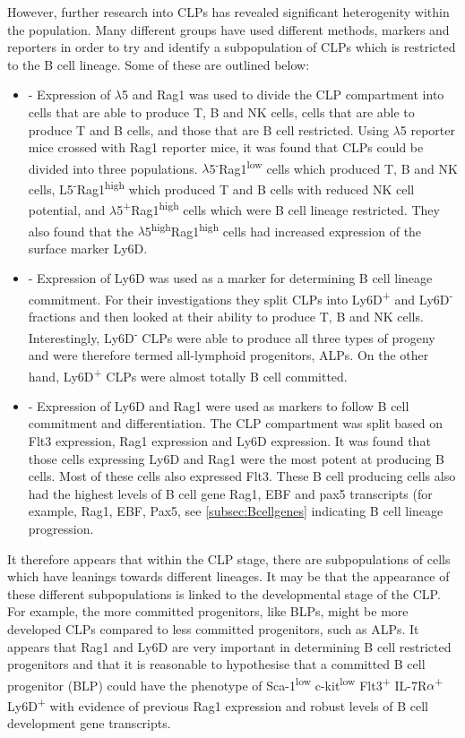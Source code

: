 However, further research into CLPs has revealed significant heterogenity within the population.
Many different groups have used different methods, markers and reporters in order to try and identify a subpopulation of CLPs which is restricted to the B cell lineage. 
Some of these are outlined below:
\begin{itemize}
\item \citet{Mansson2010} - Expression of $\lambda$5 and Rag1 was used to divide the CLP compartment into cells that are able to produce T, B and NK cells, cells that are able to produce T and B cells, and those that are B cell restricted.
Using $\lambda$5 reporter mice crossed with Rag1 reporter mice, it was found that CLPs could be divided into three populations.
$\lambda$5\textsuperscript{-}Rag1\textsuperscript{low} cells which produced T, B and NK cells, L5\textsuperscript{-}Rag1\textsuperscript{high} which produced T and B cells with reduced NK cell potential, and $\lambda$5\textsuperscript{+}Rag1\textsuperscript{high} cells which were B cell lineage restricted.
They also found that the $\lambda$5\textsuperscript{high}Rag1\textsuperscript{high} cells had increased expression of the surface marker Ly6D.
\item \citet{Inlay2009} - Expression of Ly6D was used as a marker for determining B cell lineage commitment.
For their investigations they split CLPs into Ly6D\textsuperscript{+} and Ly6D\textsuperscript{-} fractions and then looked at their ability to produce T, B and NK cells.
Interestingly, Ly6D\textsuperscript{-} CLPs were able to produce all three types of progeny and were therefore termed all-lymphoid progenitors, ALPs.
On the other hand, Ly6D\textsuperscript{+} CLPs were almost totally B cell committed.
\item \citet{Zhang2013} - Expression of Ly6D and Rag1 were used as markers to follow B cell commitment and differentiation.
The CLP compartment was split based on Flt3 expression, Rag1 expression and Ly6D expression.
It was found that those cells expressing Ly6D and Rag1 were the most potent at producing B cells. 
Most of these cells also expressed Flt3.
These B cell producing cells also had the highest levels of B cell gene Rag1, EBF and pax5 transcripts (for example, Rag1, EBF, Pax5, see \cref{subsec:Bcellgenes} indicating B cell lineage progression.
\end{itemize}

It therefore appears that within the CLP stage, there are subpopulations of cells which have leanings towards different lineages.
It may be that the appearance of these different subpopulations is linked to the developmental stage of the CLP.
For example, the more committed progenitors, like BLPs, might be more developed CLPs compared to less committed progenitors, such as ALPs.
It appears that Rag1 and Ly6D are very important in determining B cell restricted progenitors and that it is reasonable to hypothesise that a committed B cell progenitor (BLP) could have the phenotype of Sca-1\textsuperscript{low} c-kit\textsuperscript{low} Flt3\textsuperscript{+} IL-7R$\alpha$\textsuperscript{+} Ly6D\textsuperscript{+} with evidence of previous Rag1 expression and robust levels of B cell development gene transcripts.

